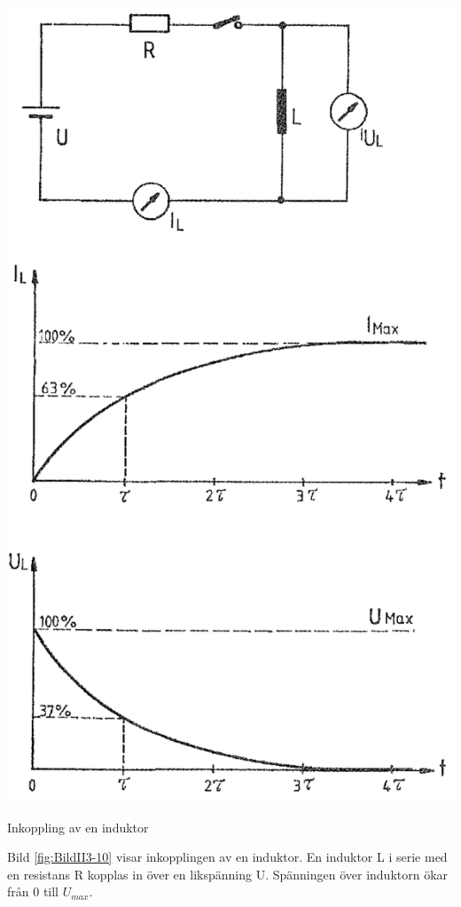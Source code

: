 \begin{marginfigure}%
  \includegraphics[width=\textwidth]{images/cropped_pdfs/bild_2_3-10.pdf}
  \caption{Inkoppling av en induktor}
  \label{fig:BildII3-10}
\end{marginfigure}

Bild \ref{fig:BildII3-10} visar inkopplingen av en induktor.
En induktor L i serie med en resistans R kopplas in över en likspänning U.
Spänningen över induktorn ökar från 0 till \(U_{max}\).

